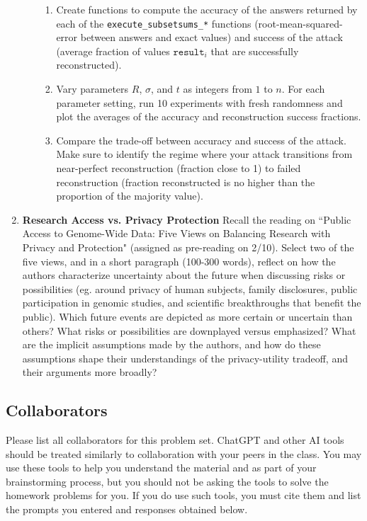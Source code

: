 \documentclass[11pt]{article}
\begin{document}
\begin{enumerate}[leftmargin=*]
\begin{enumerate}
\begin{enumerate}
    \item Create functions to compute the accuracy of the answers returned by each of the \texttt{execute\_subsetsums\_*} functions
    (root-mean-squared-error between answers and exact values) and success of the attack (average fraction of values $\texttt{result}_i$ that are successfully reconstructed).
    \item Vary parameters $R$, $\sigma$, and $t$ as integers from $1$ to $n$.
    For each parameter setting, run 10 experiments with fresh randomness and plot the averages of the accuracy and reconstruction success fractions. 
    \item Compare the trade-off between accuracy and success of the attack.
    Make sure to identify the regime where your attack transitions from near-perfect reconstruction (fraction close to 1) to failed reconstruction (fraction reconstructed is no higher than the proportion of the majority value). 
\end{enumerate}

\end{enumerate}

\item \textbf{Research Access vs. Privacy Protection} 
Recall the reading on ``Public Access to Genome-Wide Data: Five Views on Balancing Research with Privacy and Protection" (assigned as pre-reading on 2/10). 
Select two of the five views, and in a short paragraph (100-300 words), reflect on how the authors characterize uncertainty about the future when discussing risks or possibilities (eg. around privacy of human subjects, family disclosures, public participation in genomic studies, and scientific breakthroughs that benefit the public). Which future events are depicted as more certain or uncertain than others? What risks or possibilities are downplayed versus emphasized? What are the implicit assumptions made by the authors, and how do these assumptions shape their understandings of the privacy-utility tradeoff, and their arguments more broadly?
\end{enumerate}

\subsection*{Collaborators}
Please list all collaborators for this problem set. ChatGPT and other AI tools should be treated similarly to collaboration with your peers in the 
class.  You may use these tools to help you understand the material and as part of your 
brainstorming process, but you should not be asking the tools to solve the homework problems 
for you. If you do use such tools, you must cite them and  list the 
prompts you entered and responses obtained below.
\end{document}
